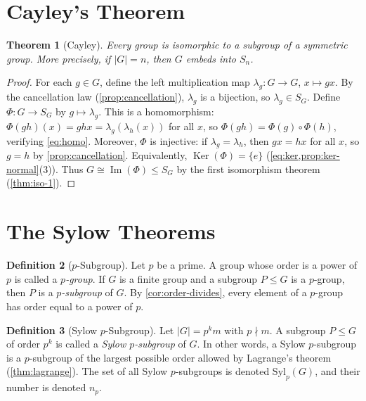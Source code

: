 \documentclass[12pt,a4paper]{article}
\theoremstyle{definition}
\newtheorem{definition}{Definition}[section]
\theoremstyle{plain}
\newtheorem{theorem}[definition]{Theorem}
\theoremstyle{remark}
\newcommand{\Ker}{\operatorname{Ker}}
\newcommand{\Img}{\operatorname{Im}}
\begin{document}
\section{Cayley's Theorem}\label{sec:cayley}

\begin{theorem}[Cayley]\label{thm:cayley}
Every group is isomorphic to a subgroup of a symmetric group. 
More precisely, if $|G| = n$, then $G$ embeds into $S_n$.
\end{theorem}

\begin{proof}
For each $g \in G$, define the left multiplication map $\lambda_g \colon G \to G$,
$x \mapsto gx$. By the cancellation law (\cref{prop:cancellation}), $\lambda_g$ is
a bijection, so $\lambda_g \in S_G$.
Define $\Phi \colon G \to S_G$ by $g \mapsto \lambda_g$.
This is a homomorphism: $\Phi(gh)(x) = ghx = \lambda_g(\lambda_h(x))$
for all $x$, so $\Phi(gh) = \Phi(g) \circ \Phi(h)$, verifying \cref{eq:homo}.
Moreover, $\Phi$ is injective: if $\lambda_g = \lambda_h$, then $gx = hx$ for all $x$,
so $g = h$ by \cref{prop:cancellation}. Equivalently, $\Ker(\Phi) = \{e\}$
(\cref{eq:ker,prop:ker-normal}(3)).
Thus $G \cong \Img(\Phi) \leq S_G$ by the first isomorphism theorem (\cref{thm:iso-1}).
\end{proof}


\section{The Sylow Theorems}\label{sec:sylow}

\begin{definition}[$p$-Subgroup]\label{def:p-subgroup}
Let $p$ be a prime. A group whose order is a power of $p$ is
called a \emph{$p$-group}. If $G$ is a finite group and a subgroup $P \leq G$
is a $p$-group, then $P$ is a \emph{$p$-subgroup} of $G$.
By \cref{cor:order-divides}, every element of a $p$-group has order equal to a power of $p$.
\end{definition}

\begin{definition}[Sylow $p$-Subgroup]\label{def:sylow}
Let $|G| = p^k m$ with $p \nmid m$. A subgroup $P \leq G$
of order $p^k$ is called a \emph{Sylow $p$-subgroup} of $G$. In other words,
a Sylow $p$-subgroup is a $p$-subgroup of the largest
possible order allowed by Lagrange's theorem (\cref{thm:lagrange}).
The set of all Sylow $p$-subgroups is denoted $\text{Syl}_p(G)$,
and their number is denoted $n_p$.
\end{definition}
\end{document}
